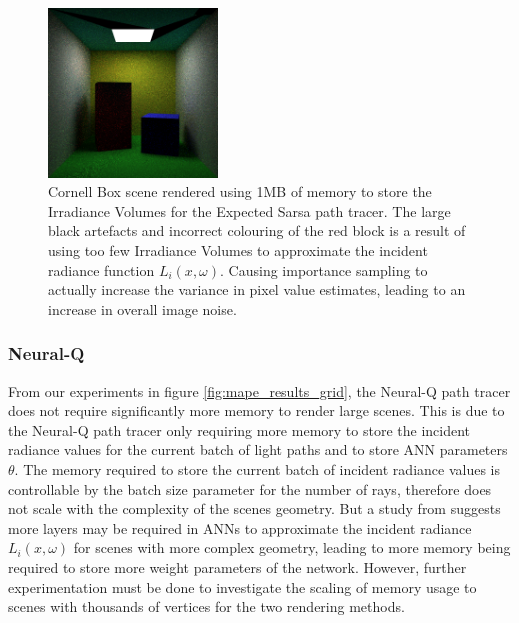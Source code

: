 \documentclass[../dissertation.tex]{subfiles}
\begin{document}
\begin{figure}[h]
\centering
\includegraphics[width=0.4\textwidth]{images/renders/sarsa_128_1Mb_incorrect.png}   
\caption{Cornell Box scene rendered using 1MB of memory to store the Irradiance Volumes for the Expected Sarsa path tracer. The large black artefacts and incorrect colouring of the red block is a result of using too few Irradiance Volumes to approximate the incident radiance function $L_i(x, \omega)$. Causing importance sampling to actually increase the variance in pixel value estimates, leading to an increase in overall image noise.}
\label{fig:incorrect_cornell}
\end{figure}

\subsubsection{Neural-Q}

From our experiments in figure \ref{fig:mape_results_grid}, the Neural-Q path tracer does not require significantly more memory to render large scenes. This is due to the Neural-Q path tracer only requiring more memory to store the incident radiance values for the current batch of light paths and to store ANN parameters $\theta$. The memory required to store the current batch of incident radiance values is controllable by the batch size parameter for the number of rays, therefore does not scale with the complexity of the scenes geometry. But a study from \cite{ren2013global} suggests more layers may be required in ANNs to approximate the incident radiance $L_i(x, \omega)$ for scenes with more complex geometry, leading to more memory being required to store more weight parameters of the network. However, further experimentation must be done to investigate the scaling of memory usage to scenes with thousands of vertices for the two rendering methods. 
\end{document}
